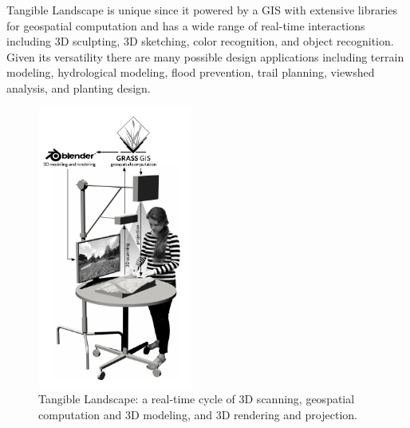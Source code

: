 \documentclass[Afour,sagev,times]{sagej} %
\begin{document}
Tangible Landscape is unique since it powered by a GIS
with extensive libraries for geospatial computation
and has a wide range of real-time interactions including 
3D sculpting, 3D sketching, color recognition, and object recognition.
Given its versatility there are many possible design applications
including terrain modeling, hydrological modeling, flood prevention,
trail planning, viewshed analysis, and planting design. 

\begin{figure}
    \begin{center}
        \includegraphics[width=0.45\textwidth]{images/diagrams/rendered_diagram_2.pdf}
        \caption{Tangible Landscape: a real-time cycle of 3D scanning, geospatial computation and 3D modeling, and 3D rendering and projection.}
        \label{fig:system_diagram}
    \end{center}
\end{figure}
\end{document}
